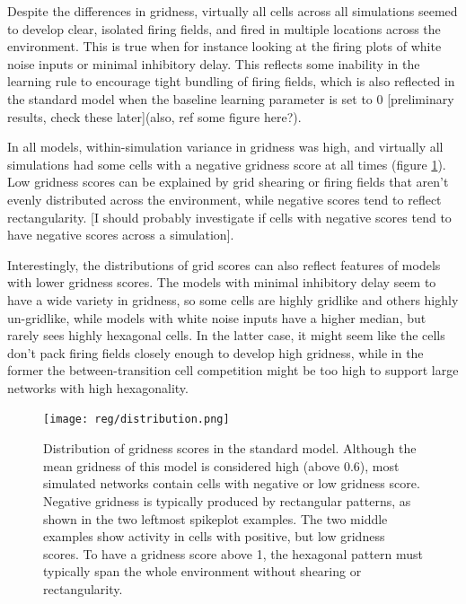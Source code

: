 \documentclass{article}
\begin{document}
    Despite the differences in gridness, virtually all cells across all simulations seemed to develop clear, isolated firing fields, and fired in multiple locations across the environment. This is true when for instance looking at the firing plots of white noise inputs or minimal inhibitory delay. This reflects some inability in the learning rule to encourage tight bundling of firing fields, which is also reflected in the standard model when the baseline learning parameter is set to 0 [preliminary results, check these later](also, ref some figure here?). 

    In all models, within-simulation variance in gridness was high, and virtually all simulations had some cells with a negative gridness score at all times (figure \ref{gscore_distribution}). Low gridness scores can be explained by grid shearing or firing fields that aren't evenly distributed across the environment, while negative scores tend to reflect rectangularity. [I should probably investigate if cells with negative scores tend to have negative scores across a simulation].

    Interestingly, the distributions of grid scores can also reflect features of models with lower gridness scores. The models with minimal inhibitory delay seem to have a wide variety in gridness, so some cells are highly gridlike and others highly un-gridlike, while models with white noise inputs have a higher median, but rarely sees highly hexagonal cells. In the latter case, it might seem like the cells don't pack firing fields closely enough to develop high gridness, while in the former the between-transition cell competition might be too high to support large networks with high hexagonality.

    \begin{figure}[H]
        \centering
        \begin{minipage}[b]{0.95\textwidth}
            \texttt{[image: reg/distribution.png]}
        \end{minipage}
        \caption{Distribution of gridness scores in the standard model. Although the mean gridness of this model is considered high (above 0.6), most simulated networks contain cells with negative or low gridness score. Negative gridness is typically produced by rectangular patterns, as shown in the two leftmost spikeplot examples. The two middle examples show activity in cells with positive, but low gridness scores. To have a gridness score above 1, the hexagonal pattern must typically span the whole environment without shearing or rectangularity.} 
        \label{gscore_distribution}
    \end{figure}
\end{document}
